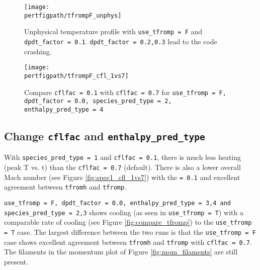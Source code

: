 \begin{figure}[!h]
\begin{minipage}[b]{0.5\linewidth}
\vspace{0pt}
\centering
\texttt{[image: \\pertfigpath/tfrompF\_unphys]}
\caption{Unphysical temperature profile with {\tt use\_tfromp = F} and 
{\tt dpdt\_factor = 0.1}. {\tt dpdt\_factor = 0.2,0.3} lead to the code 
crashing.}
\label{fig:tfrompF_unphys}
\end{minipage}
\hspace{0.5cm}
\begin{minipage}[b]{0.5\linewidth}
\vspace{0pt}
\centering
\texttt{[image: \\pertfigpath/tfrompF\_cfl\_1vs7]}
\caption{Compare {\tt cflfac = 0.1} with {\tt cflfac = 0.7} for 
{\tt use\_tfromp = F, dpdt\_factor = 0.0, species\_pred\_type = 2, 
enthalpy\_pred\_type = 4}}
\label{fig:tfrompF_cfl_1vs7}
\end{minipage}
\end{figure}

\subsection{Change {\tt cflfac} and {\tt enthalpy\_pred\_type}}

With {\tt species\_pred\_type = 1} and {\tt cflfac = 0.1}, 
there is much less heating (peak T vs. t) than the {\tt cflfac = 0.7} 
(default). There is also a lower overall Mach number (see Figure 
\ref{fig:spec1_cfl_1vs7}) with the  {\tt = 0.1} and excellent agreement 
between {\tt tfromh} and {\tt tfromp}.

{\tt use\_tfromp = F, dpdt\_factor = 0.0, enthalpy\_pred\_type = 3,4 and 
species\_pred\_type = 2,3} shows cooling (as seen in {\tt use\_tfromp = T}) 
with a comparable rate of cooling (see Figure \ref{fig:compare_tfromp}) 
to the {\tt use\_tfromp = T} case. The 
largest difference between the two runs is that the {\tt use\_tfromp = F} 
case shows excellent agreement between {\tt tfromh} and {\tt tfromp} with 
{\tt cflfac = 0.7}. The filaments in the momentum plot of Figure 
\ref{fig:mom_filaments} are still present.

